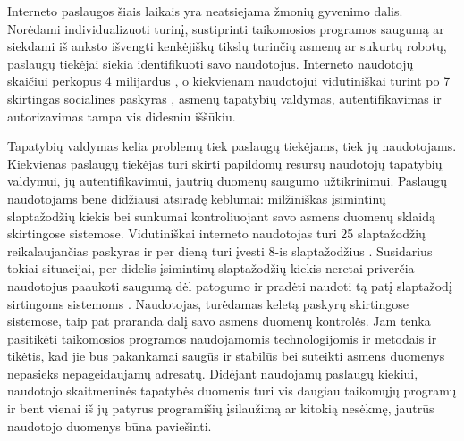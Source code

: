 Interneto paslaugos šiais laikais yra neatsiejama žmonių gyvenimo dalis.
Norėdami individualizuoti turinį, sustiprinti taikomosios programos saugumą ar siekdami
iš anksto išvengti kenkėjiškų tikslų turinčių asmenų ar sukurtų robotų, paslaugų tiekėjai
siekia identifikuoti savo naudotojus. Interneto naudotojų skaičiui perkopus 4 milijardus \cite{InternetUsers2018},
o kiekvienam naudotojui vidutiniškai turint po 7 skirtingas socialines paskyras \cite{Mander2017}, asmenų
tapatybių valdymas, autentifikavimas ir autorizavimas tampa vis didesniu iššūkiu.

Tapatybių valdymas kelia problemų tiek paslaugų tiekėjams, tiek jų naudotojams. Kiekvienas
paslaugų tiekėjas turi skirti papildomų resursų naudotojų tapatybių valdymui, jų autentifikavimui,
jautrių duomenų saugumo užtikrinimui. Paslaugų naudotojams bene didžiausi atsiradę keblumai:
milžiniškas įsimintinų slaptažodžių kiekis bei sunkumai kontroliuojant savo asmens duomenų sklaidą
skirtingose sistemose. Vidutiniškai interneto naudotojas turi 25 slaptažodžių reikalaujančias paskyras
ir per dieną turi įvesti 8-is slaptažodžius \cite{Florencio2007}. Susidarius tokiai situacijai, per didelis įsimintinų slaptažodžių kiekis neretai 
priverčia naudotojus paaukoti saugumą dėl patogumo
ir pradėti naudoti tą patį slaptažodį sirtingoms sistemoms \cite{Pashalidis2003, Samar1999}. Naudotojas, turėdamas keletą
paskyrų skirtingose sistemose, taip pat praranda dalį savo asmens duomenų kontrolės. Jam tenka pasitikėti
taikomosios programos naudojamomis technologijomis ir metodais ir tikėtis, kad jie bus pakankamai saugūs
ir stabilūs bei suteikti asmens duomenys nepasieks nepageidaujamų adresatų. Didėjant naudojamų paslaugų kiekiui,
naudotojo skaitmeninės tapatybės duomenis turi vis daugiau taikomųjų programų ir bent vienai iš jų
patyrus programišių įsilaužimą ar kitokią nesėkmę, jautrūs naudotojo duomenys būna paviešinti. 

